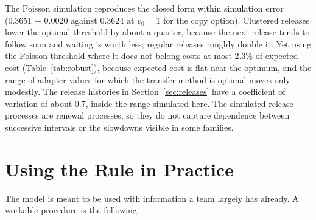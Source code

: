 \documentclass[ijds,blindrev]{informs4}
\begin{document}
The Poisson simulation reproduces the closed form within simulation error (0.3651 $\pm$ 0.0020 against 0.3624 at $v_0=1$ for the copy option). Clustered releases lower the optimal threshold by about a quarter, because the next release tends to follow soon and waiting is worth less; regular releases roughly double it. Yet using the Poisson threshold where it does not belong costs at most 2.3\% of expected cost (Table~\ref{tab:robust}), because expected cost is flat near the optimum, and the range of adapter values for which the transfer method is optimal moves only modestly. The release histories in Section~\ref{sec:releases} have a coefficient of variation of about 0.7, inside the range simulated here. The simulated release processes are renewal processes, so they do not capture dependence between successive intervals or the slowdowns visible in some families.

\section{Using the Rule in Practice}\label{sec:practice}

The model is meant to be used with information a team largely has already. A workable procedure is the following.
\end{document}
